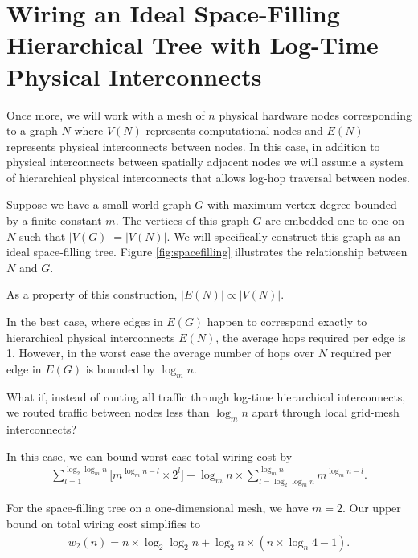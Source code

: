 \section{Wiring an Ideal Space-Filling Hierarchical Tree with Log-Time Physical Interconnects} \label{sec:proof3}

Once more, we will work with a mesh of $n$ physical hardware nodes corresponding to a graph $N$ where $V(N)$ represents computational nodes and $E(N)$ represents physical interconnects between nodes.
In this case, in addition to physical interconnects between spatially adjacent nodes we will assume a system of hierarchical physical interconnects that allows log-hop traversal between nodes.



Suppose we have a small-world graph $G$ with maximum vertex degree bounded by a finite constant $m$.
The vertices of this graph $G$ are embedded one-to-one on $N$ such that $|V(G)| = |V(N)|$.
We will specifically construct this graph as an ideal space-filling tree.
Figure \ref{fig:spacefilling} illustrates the relationship between $N$ and $G$.

As a property of this construction, $|E(N)| \propto |V(N)|$.

In the best case, where edges in $E(G)$ happen to correspond exactly to hierarchical physical interconnects $E(N)$, the average hops required per edge is 1.
However, in the worst case the average number of hops over $N$ required per edge in $E(G)$ is bounded by $\log_m n$.

What if, instead of routing all traffic through log-time hierarchical interconnects, we routed traffic between nodes less than $\log_m n$ apart through local grid-mesh interconnects?

In this case, we can bound worst-case total wiring cost by
\begin{align*}
\sum_{l = 1}^{\log_2 \log_m n} %
\Big[
  m^{\log_m n - l} %
  \times
  2^l %
\Big]
+
\log_m n %
\times
\sum_{l = \log_2 \log_m n }^{ \log_m n} %
m^{\log_m n - l}.
\end{align*}

For the space-filling tree on a one-dimensional mesh, we have $m = 2$.
Our upper bound on total wiring cost simplifies to
\begin{align*}
w_2(n) =
n \times \log_2 \log_2 n
+
\log_2 n \times (n \times \log_n 4 - 1).
\end{align*}

